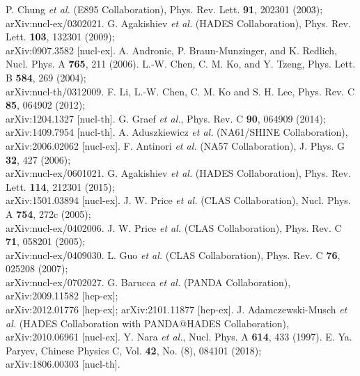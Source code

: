 \documentclass[12pt]{article}
\begin{document}
\begin{thebibliography}{99}
 P. Chung {\it et al.} (E895 Collaboration), Phys. Rev. Lett. {\bf 91}, 202301 (2003);\\
                            arXiv:nucl-ex/0302021.
 G. Agakishiev {\it et al.} (HADES Collaboration), Phys. Rev. Lett. {\bf 103}, 132301 (2009);\\
                            arXiv:0907.3582 [nucl-ex].
 A. Andronic, P. Braun-Munzinger, and K. Redlich, Nucl. Phys. A {\bf 765}, 211 (2006).
 L.-W. Chen, C. M. Ko, and Y. Tzeng, Phys. Lett. B {\bf 584}, 269 (2004);\\
                                      arXiv:nucl-th/0312009.
 F. Li, L.-W. Chen, C. M. Ko and S. H. Lee, Phys. Rev. C {\bf 85}, 064902 (2012);\\
                                    arXiv:1204.1327 [nucl-th].
 G. Graef {\it et al.}, Phys. Rev. C {\bf 90}, 064909 (2014);\\
                                      arXiv:1409.7954 [nucl-th].
 A. Aduszkiewicz {\it et al.} (NA61/SHINE Collaboration), arXiv:2006.02062 [nucl-ex].
 F. Antinori {\it et al.} (NA57 Collaboration), J. Phys. G {\bf 32}, 427 (2006);\\
                                      arXiv:nucl-ex/0601021.
 G. Agakishiev {\it et al.} (HADES Collaboration), Phys. Rev. Lett. {\bf 114}, 212301 (2015);\\
                                      arXiv:1501.03894 [nucl-ex].
 J. W. Price {\it et al.} (CLAS Collaboration), Nucl. Phys. A {\bf 754}, 272c (2005);\\
                                      arXiv:nucl-ex/0402006.
 J. W. Price {\it et al.} (CLAS Collaboration), Phys. Rev. C {\bf 71}, 058201 (2005);\\
                                      arXiv:nucl-ex/0409030.
 L. Guo {\it et al.} (CLAS Collaboration), Phys. Rev. C {\bf 76}, 025208 (2007);\\
                                      arXiv:nucl-ex/0702027.
 G. Barucca {\it et al.} (PANDA Collaboration), arXiv:2009.11582 [hep-ex];\\
                           arXiv:2012.01776 [hep-ex]; arXiv:2101.11877 [hep-ex].
 J. Adamczewski-Musch {\it et al.} (HADES Collaboration with PANDA@HADES Collaboration),\\
                                      arXiv:2010.06961 [nucl-ex].
 Y. Nara {\it et al.}, Nucl. Phys. A {\bf 614}, 433 (1997).
 E. Ya. Paryev, Chinese Physics C, Vol. {\bf 42}, No. (8), 084101 (2018);\\
                             arXiv:1806.00303 [nucl-th].


\end{thebibliography}
\end{document}
